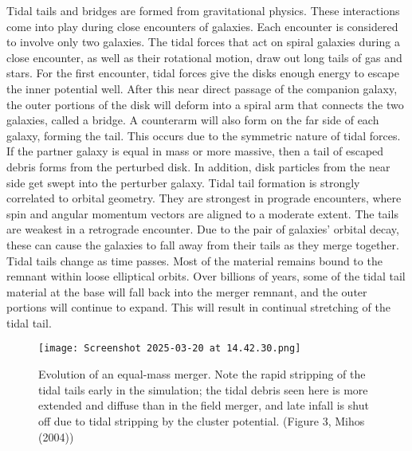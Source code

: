 \documentclass[fleqn,usenatbib]{mnras}
\begin{document}
Tidal tails and bridges are formed from gravitational physics. These interactions come into play during close encounters of galaxies. Each encounter is considered to involve only two galaxies. The tidal forces that act on spiral galaxies during a close encounter, as well as their rotational motion, draw out long tails of gas and stars. For the first encounter, tidal forces give the disks enough energy to escape the inner potential well.\cite{Mihos_2004}
After this near direct passage of the companion galaxy, the outer portions of the disk will deform into a spiral arm that connects the two galaxies, called a bridge. A counterarm will also form on the far side of each galaxy, forming the tail. This occurs due to the symmetric nature of tidal forces. If the partner galaxy is equal in mass or more massive, then a tail of escaped debris forms from the perturbed disk. In addition, disk particles from the near side get swept into the perturber galaxy. \cite{Toomre_Toomre_1972}  
Tidal tail formation is strongly correlated to orbital geometry. \cite{Mihos_2004} They are strongest in prograde encounters, where spin and angular momentum vectors are aligned to a moderate extent. The tails are weakest in a retrograde encounter. Due to the pair of galaxies' orbital decay, these can cause the galaxies to fall away from their tails as they merge together.
Tidal tails change as time passes. Most of the material remains bound to the remnant within loose elliptical orbits. Over billions of years, some of the tidal tail material at the base will fall back into the merger remnant, and the outer portions will continue to expand. This will result in continual stretching of the tidal tail. \cite{Mihos_2004}


\begin{figure}
    \centering
    \texttt{[image: Screenshot 2025-03-20 at 14.42.30.png]}
    \caption{Evolution of an equal-mass merger. Note the rapid stripping of the tidal tails early in the simulation; the tidal debris seen here is more extended and diﬀuse than in the field merger, and late infall is shut oﬀ due to tidal stripping by the cluster potential. (Figure 3, Mihos (2004))
}
    \label{fig:enter-label}
\end{figure}
\end{document}
